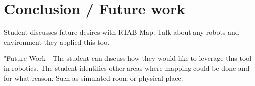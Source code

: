 \documentclass[10pt,journal,compsoc]{IEEEtran}
\begin{document}
\section{Conclusion / Future work}
Student discusses future desires with RTAB-Map. Talk about any robots and environment they applied this too.

"Future Work - The student can discuss how they would like to leverage this tool in robotics. The student identifies other areas where mapping could be done and for what reason. Such as simulated room or physical place.



\end{document}
